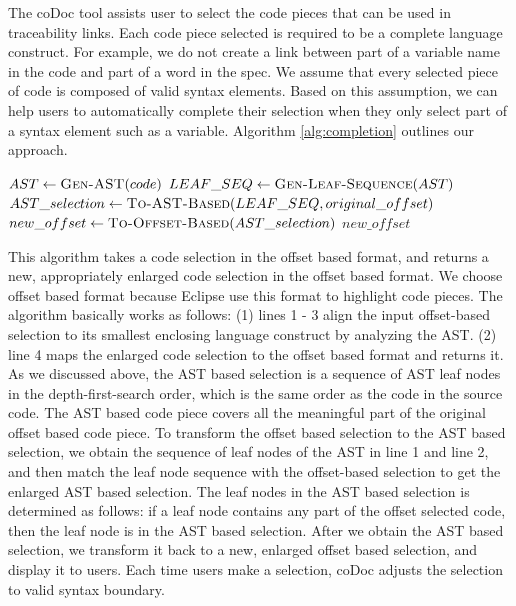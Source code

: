 The coDoc tool assists user to select the code pieces that can be used in traceability links. Each code piece selected is required to be a complete language construct.
For example, we do not create a link between part of a variable name in the code and part of a word in the spec.
We assume that every selected piece of code is composed of valid syntax elements.
Based on this assumption, we can help users to automatically complete their selection when they only select part of a syntax element such as a variable. 
Algorithm \ref{alg:completion} outlines our approach.
\begin{algorithm}[!h]
\DontPrintSemicolon
{}
$AST \leftarrow \textsc{Gen-AST}(code)$\;
$LEAF\_SEQ \leftarrow \textsc{Gen-Leaf-Sequence}(AST)$\;
$AST\_selection \leftarrow \textsc{To-AST-Based}(LEAF\_SEQ, original\_offset)$\;
$new\_offset \leftarrow \textsc{To-Offset-Based}(AST\_selection)$\;
\Return $new\_offset$\;
\caption{$\textsc{Complete-Code-Selection}(orginal\_offset)$}
\label{alg:completion}
\end{algorithm}
This algorithm takes a code selection in the offset based format,
and returns a new, appropriately enlarged code selection in the offset based format.
We choose offset based format because Eclipse use this format to highlight code pieces.
The algorithm basically works as follows: (1) lines 1 - 3 align the input offset-based selection to its smallest enclosing language construct by analyzing the AST.
(2) line 4 maps the enlarged code selection to the offset based format and returns it.  
As we discussed above, the AST based selection is a sequence of AST leaf nodes in the depth-first-search order, which is the same order as the code in the source code.
The AST based code piece covers all the meaningful part of the original offset based code piece.
To transform the offset based selection to the AST based selection,
we obtain the sequence of leaf nodes of the AST in line 1 and line 2,
and then match the leaf node sequence with the offset-based selection to get the enlarged AST based selection.
The leaf nodes in the AST based selection is determined as follows: if a leaf node contains any part of the offset selected code, then the leaf node is in the AST based selection.
After we obtain the AST based selection, we transform it back to a new, enlarged offset based selection, and display it to users.
Each time users make a selection, coDoc adjusts the selection to valid syntax boundary.

